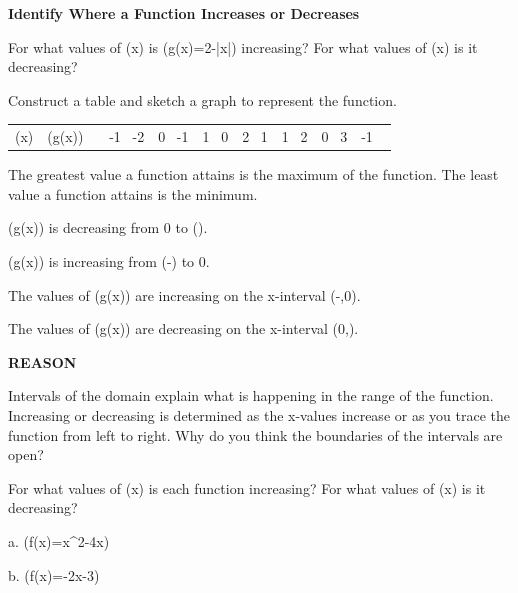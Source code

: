 \documentclass{article}
\newenvironment{concept-box}{}{}        %
\newenvironment{example}[1]{}{}         %
\newenvironment{tryit}[1]{}{}           %
\newcommand{\answer}[1]{}               %
\newcommand{\te}[1]{}                   %
\begin{document}
\begin{example}{4}
\textbf{Identify Where a Function Increases or Decreases}

For what values of (x) is (g(x)=2-|x|) increasing? For what values of (x) is it decreasing?

Construct a table and sketch a graph to represent the function.

\begin{tabular}{cc}
\toprule
(x) & (g(x)) \
 & -1 \
-2 & 0 \
-1 & 1 \
0 & 2 \
1 & 1 \
2 & 0 \
3 & -1 \
\bottomrule
\end{tabular}


The greatest value a function attains is the maximum of the function. The least value a function attains is the minimum.

(g(x)) is decreasing from 0 to (\infty).

(g(x)) is increasing from (-\infty) to 0.

The values of (g(x)) are increasing on the x-interval (-\infty,0).

The values of (g(x)) are decreasing on the x-interval (0,\infty).
\answer{Increasing: (-\infty,0); decreasing: (0,\infty). Maximum: 2 at (x=0). Table values: -1, 0, 1, 2, 1, 0, -1 for (x=-3,-2,-1,0,1,2,3).}
\end{example}

\begin{concept-box}
\textbf{REASON}

Intervals of the domain explain what is happening in the range of the function. Increasing or decreasing is determined as the x-values increase or as you trace the function from left to right. Why do you think the boundaries of the intervals are open?
\end{concept-box}

\begin{tryit}{4}
For what values of (x) is each function increasing? For what values of (x) is it decreasing?

a. (f(x)=x^2-4x)

b. (f(x)=-2x-3)

\te{Functions taken from the Savvas TE student page (TE p.8). The teacher's OneNote packet (a2_1-1.pdf p.6) mistakenly repeats Try It 3's h(x)=2x+10 prompts under item 4; correct the packet before reuse.}
\answer{a. increasing: (2,\infty); decreasing: (-\infty,2). b. not increasing on any interval; decreasing: (-\infty,\infty).}
\end{tryit}
\end{document}
